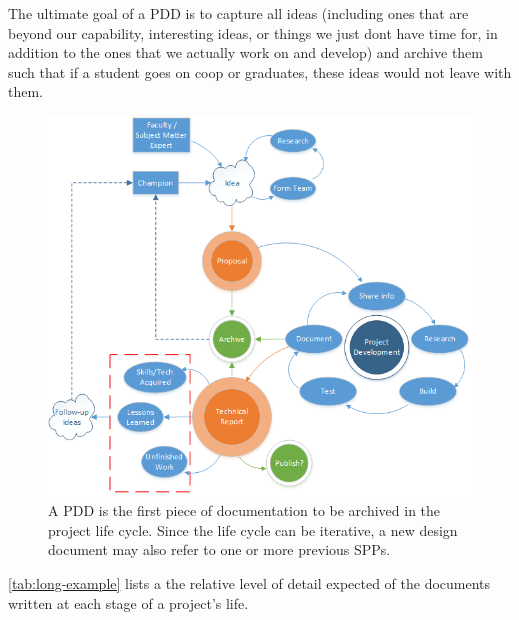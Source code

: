 \documentclass[conference]{IEEEtran} %
\begin{document}
The ultimate goal of a PDD is to capture all ideas (including ones that are beyond our capability, interesting ideas, or things we just dont have time for, in addition to the ones that we actually work on and develop) and archive them such that if a student goes on coop or graduates, these ideas would not leave with them.

\begin{figure}
  \includegraphics[width=\linewidth]{figs/project-life-cycle.png}
  \caption{A PDD is the first piece of documentation to be archived in the project life cycle. Since the life cycle can be iterative, a new design document may also refer to one or more previous SPPs.}
\label{fig:lifecycle}
\end{figure}


\autoref{tab:long-example} lists a the relative level of detail expected of the documents written at each stage of a project's life.
\end{document}
